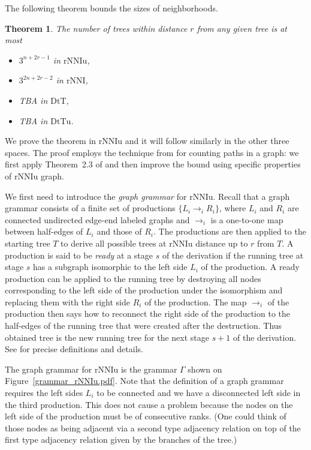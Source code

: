 \documentclass{amsart}
\newtheorem{theorem}[lemma]{Theorem}
\theoremstyle{definition}
\newcommand{\rnni}{\mathrm{rNNI}}
\newcommand{\rnniu}{\mathrm{rNNIu}}
\newcommand{\dtt}{\mathrm{DtT}}
\newcommand{\dttu}{\mathrm{DtTu}}
\begin{document}
The following theorem bounds the sizes of neighborhoods.

\begin{theorem}\label{neighSizeTh}
The number of trees within distance $r$ from any given tree is at most
\begin{itemize}
\item[] $3^{n+2r-1}$ in $\rnniu$,
\item[] $3^{2n+2r-2}$ in $\rnni$,
\item[] TBA in $\dtt$,
\item[] TBA in $\dttu$.
\end{itemize}
\end{theorem}

\proof
We prove the theorem in $\rnniu$ and it will follow similarly in the other three spaces.
The proof employs the technique from \autocite{Sleator1992-bp} for counting paths in a graph: we first apply Theorem~2.3 of \textcite{Sleator1992-bp} and then improve the bound using specific properties of $\rnniu$ graph.

We first need to introduce the {\em graph grammar} for $\rnniu$.
Recall that a graph grammar consists of a finite set of productions $\{L_i \to_i R_i\}$, where $L_i$ and $R_i$ are connected undirected edge-end labeled graphs and $\to_i$ is a one-to-one map between half-edges of $L_i$ and those of $R_i$.
The productions are then applied to the starting tree $T$ to derive all possible trees at $\rnniu$ distance up to $r$ from $T$.
A production is said to be {\em ready} at a stage $s$ of the derivation if the running tree at stage $s$ has a subgraph isomorphic to the left side $L_i$ of the production.
A ready production can be applied to the running tree by destroying all nodes corresponding to the left side of the production under the isomorphism and replacing them with the right side $R_i$ of the production.
The map $\to_i$ of the production then says how to reconnect the right side of the production to the half-edges of the running tree that were created after the destruction.
Thus obtained tree is the new running tree for the next stage $s+1$ of the derivation.
See \autocite{Sleator1992-bp} for precise definitions and details.

The graph grammar for $\rnniu$ is the grammar $\Gamma$ shown on Figure~\ref{grammar_rNNIu.pdf}.
Note that the definition of a graph grammar requires the left sides $L_i$ to be connected and we have a disconnected left side in the third production.
This does not cause a problem because the nodes on the left side of the production must be of consecutive ranks.
(One could think of those nodes as being adjacent via a second type adjacency relation on top of the first type adjacency relation given by the branches of the tree.)
\end{document}
